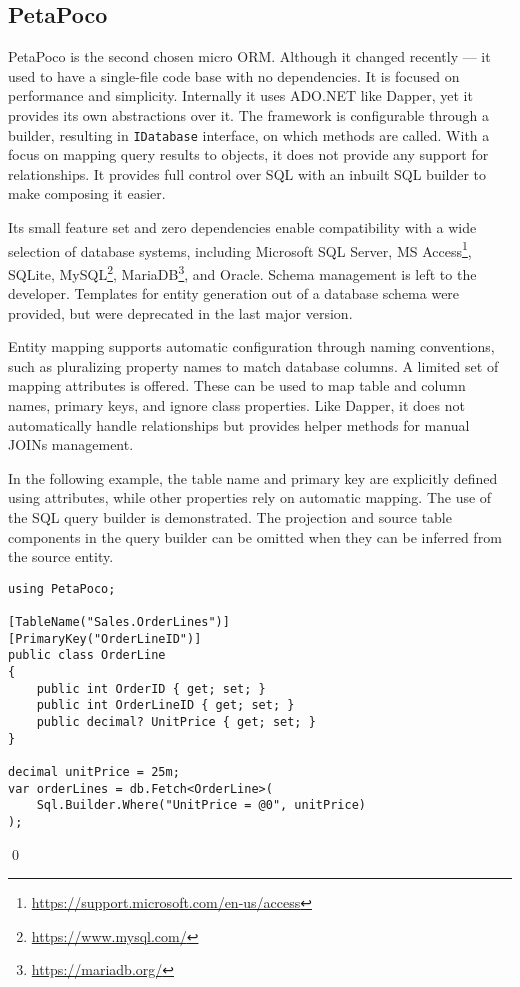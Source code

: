 \subsection{PetaPoco}\label{sec:feat_petapoco}

PetaPoco\cite{PetaPoco} is the second chosen micro ORM. Although it changed recently --- it used to have a single-file code base with no dependencies. It is focused on performance and simplicity. Internally it uses ADO.NET like Dapper, yet it provides its own abstractions over it. The framework is configurable through a builder, resulting in \texttt{IDatabase} interface, on which methods are called. With a focus on mapping query results to objects, it does not provide any support for relationships. It provides full control over SQL with an inbuilt SQL builder to make composing it easier. 

Its small feature set and zero dependencies enable compatibility with a wide selection of database systems, including Microsoft SQL Server, MS Access\footnote{\url{https://support.microsoft.com/en-us/access}}, SQLite, MySQL\footnote{\url{https://www.mysql.com/}}, MariaDB\footnote{\url{https://mariadb.org/}}, and Oracle. Schema management is left to the developer. Templates for entity generation out of a database schema were provided, but were deprecated in the last major version.

Entity mapping supports automatic configuration through naming conventions, such as pluralizing property names to match database columns. A limited set of mapping attributes is offered. These can be used to map table and column names, primary keys, and ignore class properties. Like Dapper, it does not automatically handle relationships but provides helper methods for manual JOINs management.

\begin{example}
\small
In the following example, the table name and primary key are explicitly defined using attributes, while other properties rely on automatic mapping. The use of the SQL query builder is demonstrated. The projection and source table components in the query builder can be omitted when they can be inferred from the source entity.

\begin{lstlisting}[language=CSharp]
using PetaPoco;

[TableName("Sales.OrderLines")]
[PrimaryKey("OrderLineID")]
public class OrderLine
{
    public int OrderID { get; set; }
    public int OrderLineID { get; set; }
    public decimal? UnitPrice { get; set; }
}

decimal unitPrice = 25m;
var orderLines = db.Fetch<OrderLine>(
    Sql.Builder.Where("UnitPrice = @0", unitPrice)
);
\end{lstlisting}
\qed
\end{example}

